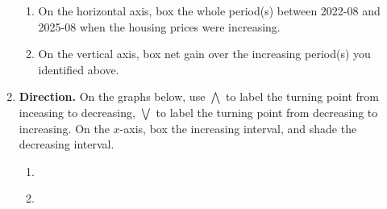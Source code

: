 \documentclass[10pt]{article}
\begin{document}
\begin{enumerate}
\begin{enumerate}
\item
On the horizontal axis, box the whole period(s) between 2022-08 and 2025-08 when the housing prices were increasing. 
\item
On the vertical axis, box net gain over the increasing period(s) you identified above. 
\end{enumerate}
\clearpage
\item {\bf Direction.} On the graphs below, use $\bigwedge$ to label the turning point from inceasing to decreasing,  $\bigvee$ to label the turning point from decreasing to increasing. On the $x$-axis, box the increasing interval, and shade the decreasing interval.
\begin{enumerate}
\item\ 
\begin{center}
\end{center}
\item\ 
\begin{center}
\end{center}
\end{enumerate}

\end{enumerate}
\end{document}
